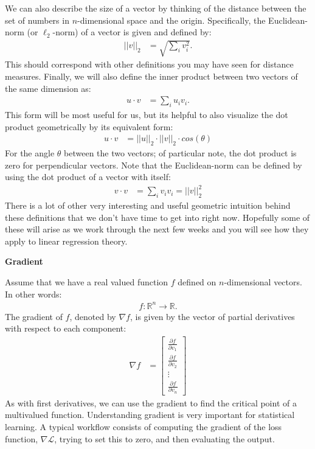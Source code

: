 \documentclass[12pt,hidelinks]{article}
\numberwithin{equation}{section}
\begin{document}
We can also describe the size of a vector by thinking of the distance between
the set of numbers in $n$-dimensional space and the origin. Specifically, the
Euclidean-norm (or $\ell_2$-norm) of a vector is given and defined by:
\begin{align}
|| v ||_2 &= \sqrt{\sum_i v_i^2}.
\end{align}
This should correspond with other definitions you may have seen for distance
measures. Finally, we will also define the inner product between two vectors
of the same dimension as:
\begin{align}
u \cdot v &= \sum_i u_i v_i.
\end{align}
This form will be most useful for us, but its helpful to also visualize the
dot product geometrically by its equivalent form:
\begin{align}
u \cdot v &= || u ||_2 \cdot || v ||_2 \cdot cos(\theta)
\end{align}
For the angle $\theta$ between the two vectors; of particular note, the dot
product is zero for perpendicular vectors. Note that the Euclidean-norm can
be defined by using the dot product of a vector with itself:
\begin{align}
v \cdot v &= \sum_i v_i v_i = || v ||_2^2
\end{align}
There is a lot of other very interesting and useful geometric intuition behind
these definitions that we don't have time to get into right now. Hopefully
some of these will arise as we work through the next few weeks and you will
see how they apply to linear regression theory.

\textbf{Gradient}

Assume that we have a real valued function $f$ defined on $n$-dimensional
vectors. In other words:
\begin{align}
f: \mathbb{R}^n \rightarrow \mathbb{R}.
\end{align}
The gradient of $f$, denoted by $\nabla f$, is given by the vector of partial
derivatives with respect to each component:
\begin{align}
\nabla f &= \begin{bmatrix} \frac{\partial f}{\partial v_1} \\
 \frac{\partial f}{\partial v_2}  \\ \vdots \\
 \frac{\partial f}{\partial v_n}  \end{bmatrix}
\end{align}
As with first derivatives, we can use the gradient to find the critical point
of a multivalued function. Understanding gradient is very important for
statistical learning. A typical workflow consists of computing the
gradient of the loss function, $\nabla \mathcal{L}$, trying to set this to
zero, and then evaluating the output.
\end{document}
